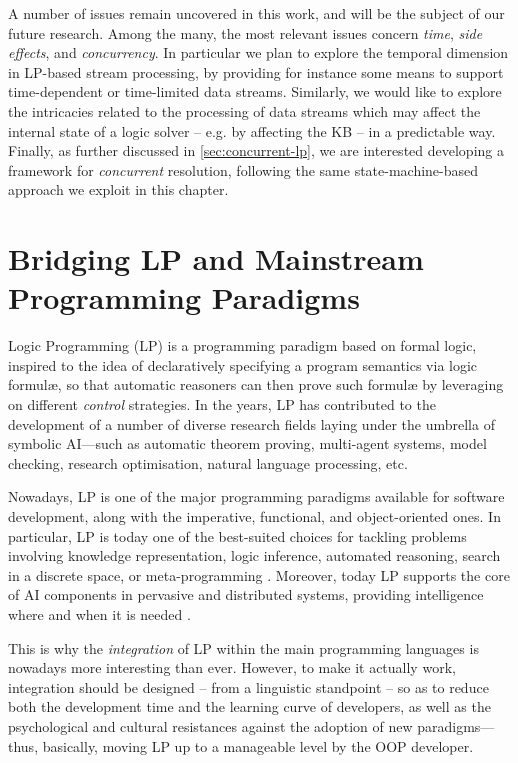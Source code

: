 \documentclass[12pt,a4paper,openright,twoside]{book}
\begin{document}
A number of issues remain uncovered in this work, and will be the subject of our future research.
%
Among the many, the most relevant issues concern \emph{time}, \emph{side effects}, and \emph{concurrency}.
%
In particular we plan to explore the temporal dimension in LP-based stream processing, by providing for instance some means to support time-dependent or time-limited data streams.
%
Similarly, we would like to explore the intricacies related to the processing of data streams which may affect the internal state of a logic solver -- e.g. by affecting the KB -- in a predictable way.
%
Finally, as further discussed in \cref{sec:concurrent-lp}, we are interested developing a framework for \emph{concurrent} resolution, following the same state-machine-based approach we exploit in this chapter.

\chapter{Bridging LP and Mainstream Programming Paradigms}
\label{chap:kt-dsl}


Logic Programming (LP) \cite{Apt2001,Kowalski1974} is a programming pa\-ra\-di\-gm based on formal logic, inspired to the idea of declaratively specifying a program semantics via logic formul\ae{}, so that automatic reasoners can then prove such formul\ae{} by leveraging on different \emph{control} strategies.
%
In the years, LP has contributed to the development of a number of diverse research fields laying under the umbrella of symbolic AI---such as automatic theorem proving, multi-agent systems, model checking, research optimisation, natural language processing, etc.

Nowadays, LP is one of the major programming pa\-ra\-di\-gms available for software development, along with the imperative, functional, and object-oriented ones.
%
In particular, LP is today one of the best-suited choices for tackling problems involving knowledge representation, logic inference, automated reasoning, search in a discrete space, or meta-programming \cite{logictech-information11}.
%
Moreover, today LP supports the core of AI components in pervasive and distributed systems, providing intelligence where and when it is needed \cite{microintelligencelp-mmasII}.

This is why the \emph{integration} of LP within the main programming languages is  nowadays more interesting than ever.
%
However, to make it actually work, integration should be designed -- from a linguistic standpoint -- so as to reduce both the development time and the learning curve of developers, as well as the psychological and cultural resistances against the adoption of new paradigms---thus, basically, moving LP up to a manageable level by the OOP developer.
\end{document}
